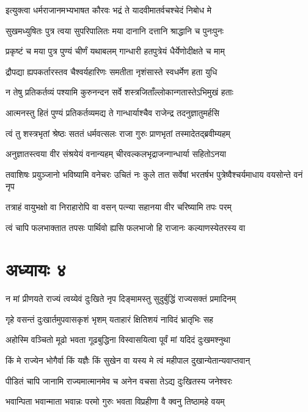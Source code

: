 \twolineshloka
{इत्युक्त्वा धर्मराजानमभ्यभाषत कौरवः}
{भद्रं ते यादवीमातर्वचश्चेदं निबोध मे}


\twolineshloka
{सुखमध्युषितः पुत्र त्वया सुपरिपालितः}
{मया दानानि दत्तानि श्राद्धानि च पुनःपुनः}


\twolineshloka
{प्रकृष्टं च मया पुत्र पुण्यं चीर्णं यथाबलम्}
{गान्धारी हतपुत्रेयं धैर्येणोदीक्षते च माम्}


\twolineshloka
{द्रौपद्या ह्यपकर्तारस्तव चैश्वर्यहारिणः}
{समतीता नृशंसास्ते स्वधर्मेण हता युधि}


\twolineshloka
{न तेषु प्रतिकर्तव्यं पश्यामि कुरुनन्दन}
{सर्वे शस्त्रजिताँल्लोकान्गतास्तेऽभिमुखं हताः}


\twolineshloka
{आत्मनस्तु हितं पुण्यं प्रतिकर्तव्यमद्य ते}
{गान्धार्याश्चैव राजेन्द्र तदनुज्ञातुमर्हसि}


\twolineshloka
{त्वं तु शस्त्रभृतां श्रेष्ठः सततं धर्मवत्सलः}
{राजा गुरुः प्राणभृतां तस्मादेतद्ब्रवीम्यहम्}


\twolineshloka
{अनुज्ञातस्त्वया वीर संश्रयेयं वनान्यहम्}
{चीरवल्कलभृद्राजन्गान्धार्या सहितोऽनया}


\threelineshloka
{तवाशिषः प्रयुञ्जानो भविष्यामि वनेचरः}
{उचितं नः कुले तात सर्वेषां भरतर्षभ}
{पुत्रेष्वैश्चर्यमाधाय वयसोन्ते वनं नृप}


\twolineshloka
{तत्राहं वायुभक्षो वा निराहारोपि वा वसन्}
{पत्न्या सहानया वीर चरिष्यामि तपः परम्}


\twolineshloka
{त्वं चापि फलभाक्तात तपसः पार्थिवो ह्यसि}
{फलभाजो हि राजानः कल्याणस्येतरस्य वा}


\chapter{अध्यायः ४}
\twolineshloka
{न मां प्रीणयते राज्यं त्वय्येवं दुःखिते नृप}
{दिङ्मामस्तु सुदुर्बुद्धिं राज्यसक्तं प्रमादिनम्}


\twolineshloka
{गृहे वसन्तं दुःखार्तमुपवासकृशं भृशम्}
{यताहारं क्षितिशयं नाविदं भ्रातृभिः सह}


\twolineshloka
{अहोस्मि वञ्चितो मूढो भवता गूढबुद्धिना}
{विस्वासयित्वा पूर्वं मां यदिदं दुःखमश्नुथा}


\twolineshloka
{किं मे राज्येन भोगैर्वा किं यज्ञैः किं सुखेन वा}
{यस्य मे त्वं महीपाल दुखान्येतान्यवाप्तवान्}


\twolineshloka
{पीडितं चापि जानामि राज्यमात्मानमेव च}
{अनेन वचसा तेऽद्य दुःखितस्य जनेश्वरः}


\twolineshloka
{भवान्पिता भवान्माता भवान्नः परमो गुरुः}
{भवता विप्रहीणा वै क्वनु तिष्ठामहे वयम्}


